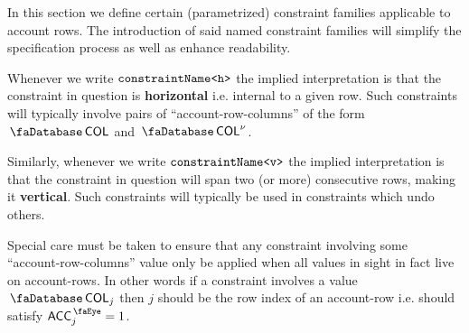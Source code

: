 In this section we define certain (parametrized) constraint families applicable to account rows.
The introduction of said named constraint families will simplify the specification process as well as enhance readability.

\saNote{} Whenever we write $\texttt{constraintName}\texttt{<h>}$ the implied interpretation is that the constraint in question is \textbf{horizontal} i.e. internal to a given row.
Such constraints will typically involve pairs of ``account-row-columns'' of the form $\accountSignifier\col{COL}$ and $\accountSignifier\col{COL}\new$.

\saNote{} Similarly, whenever we write $\texttt{constraintName}\texttt{<v>}$ the implied interpretation is that the constraint in question will span two (or more) consecutive rows, making it \textbf{vertical}.
Such constraints will typically be used in constraints which undo others.

\saNote{} Special care must be taken to ensure that any constraint involving some ``account-row-columns'' value only be applied when all values in sight in fact live on account-rows.
In other words if a constraint involves a value $\accountSignifier\col{COL}_{j}$ then $j$ should be the row index of an account-row i.e. should satisfy $\peekAccount_{j} = 1$.
